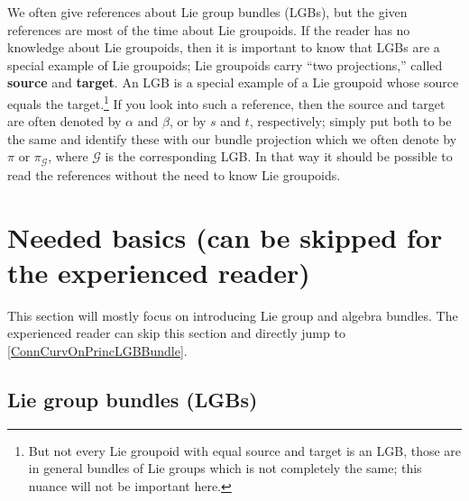 \documentclass[reqno,a4paper,oneside]{amsart}
\theoremstyle{plain}
\theoremstyle{remark}
\theoremstyle{definition}
\begin{document}
We often give references about Lie group bundles (LGBs), but the given references are most of the time about Lie groupoids. If the reader has no knowledge about Lie groupoids, then it is important to know that LGBs are a special example of Lie groupoids; Lie groupoids carry ``two projections,'' called \textbf{source} and \textbf{target}. An LGB is a special example of a Lie groupoid whose source equals the target.\footnote{But not every Lie groupoid with equal source and target is an LGB, those are in general bundles of Lie groups which is not completely the same; this nuance will not be important here.} If you look into such a reference, then the source and target are often denoted by $\alpha$ and $\beta$, or by $s$ and $t$, respectively; simply put both to be the same and identify these with our bundle projection which we often denote by $\pi$ or $\pi_{\mathcal{G}}$, where $\mathcal{G}$ is the corresponding LGB. In that way it should be possible to read the references without the need to know Lie groupoids.

\newpage

\section{Needed basics (can be skipped for the experienced reader)}

This section will mostly focus on introducing Lie group and algebra bundles. The experienced reader can skip this section and directly jump to \ref{ConnCurvOnPrincLGBBundle}.

\subsection{Lie group bundles (LGBs)}\label{LGBSection}
\end{document}
